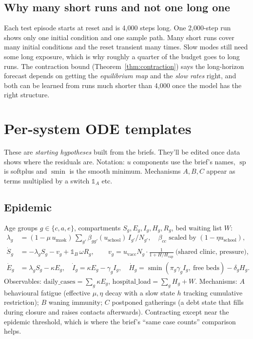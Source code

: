 \documentclass[11pt]{article}
\theoremstyle{plain}
\theoremstyle{definition}
\theoremstyle{remark}
\newcommand{\softmin}{\operatorname{smin}}
\newcommand{\softplus}{\operatorname{sp}}
\begin{document}
\subsection{Why many short runs and not one long one}
Each test episode starts at reset and is 4,000 steps long. One 2,000-step run shows only one initial condition and one sample path. Many short runs cover many initial conditions and the reset transient many times. Slow modes still need some long exposure, which is why roughly a quarter of the budget goes to long runs. The contraction bound (Theorem~\ref{thm:contraction}) says the long-horizon forecast depends on getting the \emph{equilibrium map} and the \emph{slow rates} right, and both can be learned from runs much shorter than 4,000 once the model has the right structure.

\section{Per-system ODE templates}\label{sec:systems}

These are \emph{starting hypotheses} built from the briefs. They'll be edited once data shows where the residuals are. Notation: $u$ components use the brief's names, $\softplus$ is softplus and $\softmin$ is the smooth minimum. Mechanisms $A,B,C$ appear as terms multiplied by a switch $\mathbb 1_{A}$ etc.

\subsection{Epidemic}
Age groups $g\in\{c,a,e\}$, compartments $S_g,E_g,I_g,H_g,R_g$, bed waiting list $W$:
\begin{align*}
\lambda_g&=(1-\mu\,u_{\text{mask}})\,\textstyle\sum_{g'}\beta_{gg'}(u_{\text{school}})\,I_{g'}/N_{g'},\quad \beta_{cc}\text{ scaled by }(1-\eta u_{\text{school}}),\\
\dot S_g&=-\lambda_gS_g-v_g+\mathbb 1_B\,\omega R_g,\qquad v_g=u_{\text{vacc}}N_g\cdot\frac{1}{1+H/H_{\text{cap}}}\ \text{(shared clinic, pressure)},\\
\dot E_g&=\lambda_gS_g-\kappa E_g,\quad \dot I_g=\kappa E_g-\gamma_gI_g,\quad \dot H_g=\softmin(\pi_g\gamma_gI_g,\ \text{free beds})-\delta_gH_g.
\end{align*}
Observables: $\text{daily\_cases}=\sum_g\kappa E_g$, $\text{hospital\_load}=\sum_gH_g+W$. Mechanisms: $A$ behavioural fatigue (effective $\mu,\eta$ decay with a slow state $h$ tracking cumulative restriction); $B$ waning immunity; $C$ postponed gatherings (a debt state that fills during closure and raises contacts afterwards). Contracting except near the epidemic threshold, which is where the brief's ``same case counts'' comparison helps.
\end{document}
